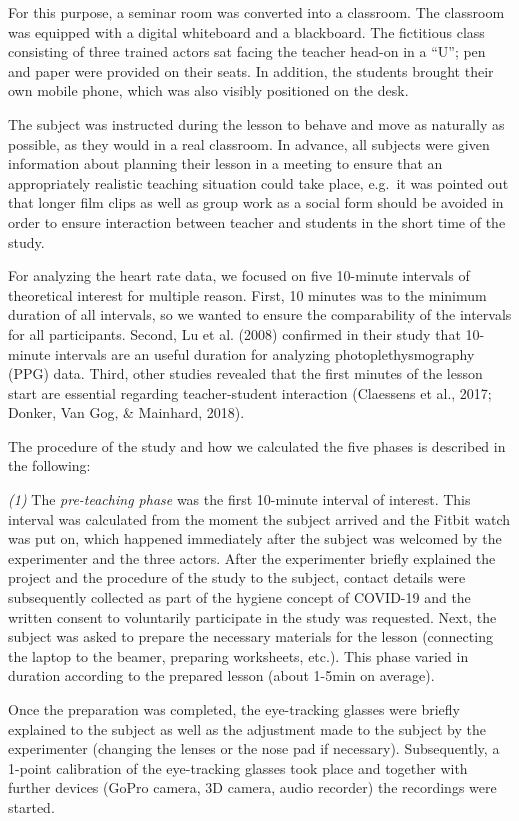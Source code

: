 \documentclass[
  man,floatsintext]{apa6}
\begin{document}
For this purpose, a seminar room was converted into a classroom. The classroom was equipped with a digital whiteboard and a blackboard. The fictitious class consisting of three trained actors sat facing the teacher head-on in a ``U''; pen and paper were provided on their seats. In addition, the students brought their own mobile phone, which was also visibly positioned on the desk.

The subject was instructed during the lesson to behave and move as naturally as possible, as they would in a real classroom. In advance, all subjects were given information about planning their lesson in a meeting to ensure that an appropriately realistic teaching situation could take place, e.g.~it was pointed out that longer film clips as well as group work as a social form should be avoided in order to ensure interaction between teacher and students in the short time of the study.

For analyzing the heart rate data, we focused on five 10-minute intervals of theoretical interest for multiple reason. First, 10 minutes was to the minimum duration of all intervals, so we wanted to ensure the comparability of the intervals for all participants. Second, Lu et al. (2008) confirmed in their study that 10-minute intervals are an useful duration for analyzing photoplethysmography (PPG) data. Third, other studies revealed that the first minutes of the lesson start are essential regarding teacher-student interaction (Claessens et al., 2017; Donker, Van Gog, \& Mainhard, 2018).

The procedure of the study and how we calculated the five phases is described in the following:

\emph{(1)} The \emph{pre-teaching phase} was the first 10-minute interval of interest. This interval was calculated from the moment the subject arrived and the Fitbit watch was put on, which happened immediately after the subject was welcomed by the experimenter and the three actors. After the experimenter briefly explained the project and the procedure of the study to the subject, contact details were subsequently collected as part of the hygiene concept of COVID-19 and the written consent to voluntarily participate in the study was requested. Next, the subject was asked to prepare the necessary materials for the lesson (connecting the laptop to the beamer, preparing worksheets, etc.). This phase varied in duration according to the prepared lesson (about 1-5min on average).

Once the preparation was completed, the eye-tracking glasses were briefly explained to the subject as well as the adjustment made to the subject by the experimenter (changing the lenses or the nose pad if necessary). Subsequently, a 1-point calibration of the eye-tracking glasses took place and together with further devices (GoPro camera, 3D camera, audio recorder) the recordings were started.
\end{document}

